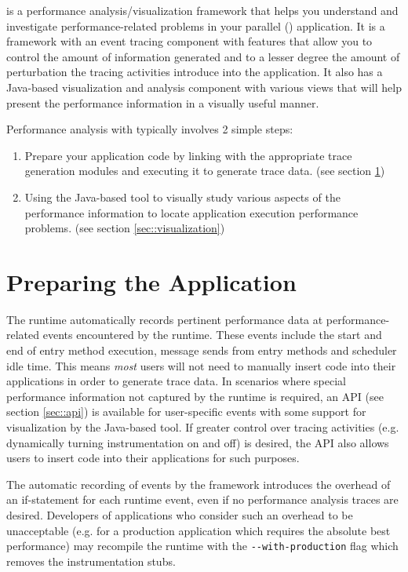 \projections{} is a performance analysis/visualization framework that
helps you understand and investigate performance-related problems in
your parallel (\charmpp{}) application. It is a framework with an
event tracing component with features that allow you to control the
amount of information generated and to a lesser degree the amount of
perturbation the tracing activities introduce into the application. It
also has a Java-based visualization and analysis component with
various views that will help present the performance information in a
visually useful manner.

Performance analysis with \projections{} typically involves 2 simple
steps:

\begin{enumerate}
\item 
Prepare your application code by linking with the appropriate trace
generation modules and executing it to generate trace data. (see
section \ref{sec::preparation})
\item
Using the Java-based tool to visually study various aspects of the
performance information to locate application execution performance
problems. (see section \ref{sec::visualization})
\end{enumerate}

\section{Preparing the Application}
\label{sec::preparation}

The \charmpp{} runtime automatically records pertinent performance
data at performance-related events encountered by the runtime. These
events include the start and end of entry method execution, message
sends from entry methods and scheduler idle time. This means {\em
most} users will not need to manually insert code into their
applications in order to generate trace data. In scenarios where
special performance information not captured by the runtime is
required, an API (see section \ref{sec::api}) is available for
user-specific events with some support for visualization by the
Java-based tool. If greater control over tracing activities
(e.g. dynamically turning instrumentation on and off) is desired, the
API also allows users to insert code into their applications for such
purposes.

The automatic recording of events by the \projections{} framework
introduces the overhead of an if-statement for each runtime event,
even if no performance analysis traces are desired. Developers of
\charmpp{} applications who consider such an overhead to be
unacceptable (e.g. for a production application which requires the
absolute best performance) may recompile the \charmpp{} runtime with
the {\tt -{}-with-production} flag which removes the instrumentation
stubs.

